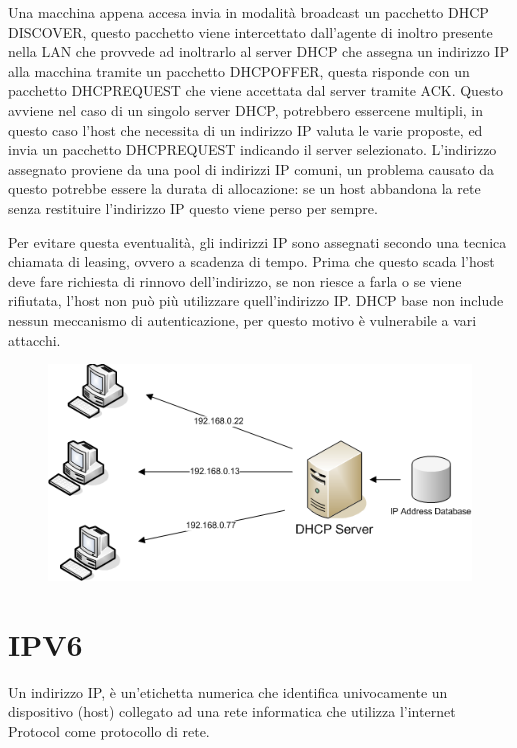 Una macchina appena accesa invia in modalità broadcast un pacchetto DHCP DISCOVER, questo pacchetto viene intercettato dall’agente di inoltro presente nella LAN che provvede ad inoltrarlo al server DHCP che assegna un indirizzo IP alla macchina tramite un pacchetto DHCPOFFER, questa risponde con un pacchetto DHCPREQUEST che viene accettata dal server tramite ACK.
Questo avviene nel caso di un singolo server DHCP, potrebbero essercene multipli, in questo caso l’host che necessita di un indirizzo IP valuta le varie proposte, ed invia un pacchetto DHCPREQUEST indicando il server selezionato.
L’indirizzo assegnato proviene da una pool di indirizzi IP comuni, un problema causato da questo potrebbe essere la durata di allocazione: se un host abbandona la rete senza restituire l’indirizzo IP questo viene perso per sempre.

Per evitare questa eventualità, gli indirizzi IP sono assegnati secondo una tecnica chiamata di leasing, ovvero a scadenza di tempo. Prima che questo scada l’host deve fare richiesta di rinnovo dell’indirizzo, se non riesce a farla o se viene rifiutata, l’host non può più utilizzare quell’indirizzo IP.
DHCP base non include nessun meccanismo di autenticazione, per questo motivo è vulnerabile a vari attacchi.

\begin{figure}[H]
\centering
\includegraphics[scale=0.6]{res/img/44_DHCP.png}
\end{figure}

\section{IPV6}

Un indirizzo IP, è un’etichetta numerica che identifica univocamente un dispositivo (host) collegato ad una rete informatica che utilizza l’internet Protocol come protocollo di rete.

